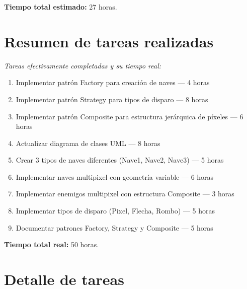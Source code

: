 \documentclass[12pt, a4paper]{article}
\begin{document}
\textbf{Tiempo total estimado:} 27 horas.

\vspace{1.5em}

\section{Resumen de tareas realizadas}

\textit{Tareas efectivamente completadas y su tiempo real:}

\begin{enumerate}[leftmargin=2em]
    \item Implementar patrón Factory para creación de naves — 4 horas
    \item Implementar patrón Strategy para tipos de disparo — 8 horas
    \item Implementar patrón Composite para estructura jerárquica de píxeles — 6 horas
    \item Actualizar diagrama de clases UML — 8 horas
    \item Crear 3 tipos de naves diferentes (Nave1, Nave2, Nave3) — 5 horas
    \item Implementar naves multipixel con geometría variable — 6 horas
    \item Implementar enemigos multipixel con estructura Composite — 3 horas
    \item Implementar tipos de disparo (Pixel, Flecha, Rombo) — 5 horas
    \item Documentar patrones Factory, Strategy y Composite — 5 horas
\end{enumerate}

\textbf{Tiempo total real:} 50 horas.

\vspace{1.5em}

\section{Detalle de tareas}

\end{document}
